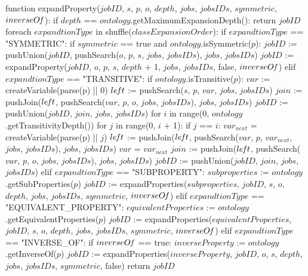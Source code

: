 function expandProperty($jobID$, $s$, $p$, $o$, $depth$, $jobs$, $jobsIDs$, $symmetric$, $inverseO\textrm{\emph{f}}$):
    if $depth$ == $ontology$.getMaximumExpansionDepth():
        return $jobID$
    foreach $expandtionType$ in shuffle($classExpansionOrder$):
        if $expandtionType$ == "SYMMETRIC":
            if $symmetric$ == true and $ontology$.isSymmetric($p$):
                $jobID$ := pushUnion($jobID$, pushSearch($o$, $p$, $s$, $jobs$, $jobsIDs$), $jobs$, $jobsIDs$)
                $jobID$ := expandProperty($jobID$, $o$, $p$, $s$, $depth$ + 1, $jobs$, $jobsIDs$, false, $inverseO\textrm{\emph{f}}$)
        elif $expandtionType$ == "TRANSITIVE":
            if $ontology$.isTransitive($p$):
                $var$ := createVariable(parse(p) || 0)
                $le\textrm{\emph{f}}t$ := pushSearch($s$, $p$, $var$, $jobs$, $jobsIDs$)
                $join$ := pushJoin($le\textrm{\emph{f}}t$, pushSearch($var$, $p$, $o$, $jobs$, $jobsIDs$), $jobs$, $jobsIDs$)
                $jobID$ := pushUnion($jobID$, $join$, $jobs$, $jobsIDs$)
                for $i$ in range(0, $ontology$.getTransitivityDepth())
                    for $j$ in range(0, $i$ + 1):
                        if $j$ == $i$: 
                            $var_{next}$ = createVariable(parse(p) || $j$)
                            $le\textrm{\emph{f}}t$ := pushJoin($le\textrm{\emph{f}}t$, pushSearch($var$, $p$, $var_{next}$, $jobs$, $jobsIDs$), $jobs$, $jobsIDs$)
                            $var$ = $var_{next}$
                    $join$ := pushJoin($le\textrm{\emph{f}}t$, pushSearch($var$, $p$, $o$, $jobs$, $jobsIDs$), $jobs$, $jobsIDs$)
                    $jobID$ := pushUnion($jobID$, $join$, $jobs$, $jobsIDs$)
        elif $expandtionType$ == "SUBPROPERTY":
            $subproperties$ := $ontology$.getSubProperties($p$)
            $jobID$ := expandProperties($subproperties$, $jobID$, $s$, $o$, $depth$, $jobs$, $jobsIDs$, $symmetric$, $inverseO\textrm{\emph{f}}$)
        elif $expandtionType$ == "EQUIVALENT_PROPERTY":
            $equivalentProperties$ := $ontology$.getEquivalentProperties($p$)
            $jobID$ := expandProperties($equivalentProperties$, $jobID$, $s$, $o$, $depth$, $jobs$, $jobsIDs$, $symmetric$, $inverseO\textrm{\emph{f}}$)
        elif $expandtionType$ == "INVERSE_OF":
            if $inverseO\textrm{\emph{f}}$ == true:
                $inverseProperty$ := $ontology$.getInverseOf($p$)
                $jobID$ := expandProperties($inverseProperty$, $jobID$, $o$, $s$, $depth$, $jobs$, $jobsIDs$, $symmetric$, false)
    return $jobID$
